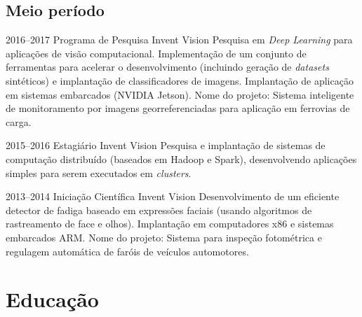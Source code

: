 \documentclass[a4paper]{cv-friggeri-x}
\begin{document}

\subsection{Meio período}

\begin{entrylist}

\entry
    {2016--2017}
    {Programa de Pesquisa}%
    {Invent Vision}
    {Pesquisa em \textit{Deep Learning} para aplicações de visão computacional. Implementação de um conjunto de ferramentas para acelerar o desenvolvimento (incluindo geração de \textit{datasets} sintéticos) e implantação de classificadores de imagens. Implantação de aplicação em sistemas embarcados (NVIDIA Jetson). Nome do projeto: Sistema inteligente de monitoramento por imagens georreferenciadas para aplicação em ferrovias de carga.}

\entry
    {2015--2016}
    {Estagiário}
    {Invent Vision}
    {Pesquisa e implantação de sistemas de computação distribuído (baseados em Hadoop e Spark), desenvolvendo aplicações simples para serem executados em \textit{clusters}.}

\entry
    {2013--2014}
    {Iniciação Científica}
    {Invent Vision}
    {Desenvolvimento de um eficiente detector de fadiga baseado em expressões faciais (usando algoritmos de rastreamento de face e olhos). Implantação em computadores x86 e sistemas embarcados ARM. Nome do projeto: Sistema para inspeção fotométrica e regulagem automática de faróis de veículos automotores.}



\end{entrylist}


\section{Educação}
\end{document}
